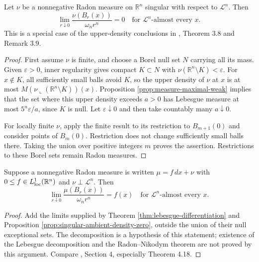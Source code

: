 \begin{proposition}\label{prop:singular-ambient-density-zero}
Let $\nu$ be a nonnegative Radon measure on $\mathbb R^n$ singular with respect to $\mathcal L^n$. Then
\[
 \lim_{r\downarrow0}\frac{\nu(B_r(x))}{\omega_n r^n}=0
 \quad\text{for }\mathcal L^n\text{-almost every }x.
\]
This is a special case of the upper-density conclusions in \cite{Sim18}, Theorem 3.8 and Remark 3.9.
\end{proposition}
\begin{proof}
First assume $\nu$ is finite, and choose a Borel null set $N$ carrying all its mass. Given $\varepsilon>0$, inner regularity gives compact $K\subset N$ with $\nu(\mathbb R^n\setminus K)<\varepsilon$. For $x\notin K$, all sufficiently small balls avoid $K$, so the upper density of $\nu$ at $x$ is at most $M(\nu\llcorner(\mathbb R^n\setminus K))(x)$. Proposition \ref{prop:measure-maximal-weak} implies that the set where this upper density exceeds $a>0$ has Lebesgue measure at most $5^n\varepsilon/a$, since $K$ is null. Let $\varepsilon\downarrow0$ and then take countably many $a\downarrow0$.

For locally finite $\nu$, apply the finite result to its restriction to $B_{m+1}(0)$ and consider points of $B_m(0)$. Restriction does not change sufficiently small balls there. Taking the union over positive integers $m$ proves the assertion. Restrictions to these Borel sets remain Radon measures.
\end{proof}

\begin{corollary}\label{cor:ball-density-ac-part}
Suppose a nonnegative Radon measure is written $\mu=f\,dx+\nu$ with $0\leq f\in L^1_{\rm loc}(\mathbb R^n)$ and $\nu\perp\mathcal L^n$. Then
\[
 \lim_{r\downarrow0}\frac{\mu(B_r(x))}{\omega_n r^n}=f(x)
 \quad\text{for }\mathcal L^n\text{-almost every }x.
\]
\end{corollary}
\begin{proof}
Add the limits supplied by Theorem \ref{thm:lebesgue-differentiation} and Proposition \ref{prop:singular-ambient-density-zero}, outside the union of their null exceptional sets. The decomposition is a hypothesis of this statement; existence of the Lebesgue decomposition and the Radon--Nikodym theorem are not proved by this argument. Compare \cite{Sim18}, Section 4, especially Theorem 4.18.
\end{proof}

